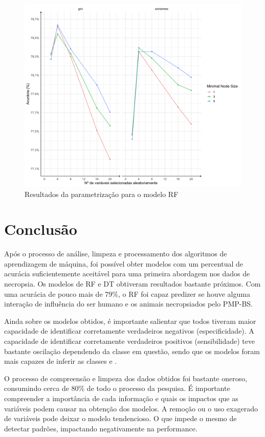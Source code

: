 \documentclass[12pt]{article}
\begin{document}
\begin{figure}[ht]
\centering
\includegraphics[width=.8\textwidth]{rf_resultados.png}
\caption{Resultados da parametrização para o modelo RF}
\label{fig:rf_resultados}
\end{figure}

\section{Conclusão}

Após o processo de análise, limpeza e processamento dos algoritmos de aprendizagem de máquina, foi possível obter modelos com um percentual de acurácia suficientemente aceitável para uma primeira abordagem nos dados de necropsia. Os modelos de RF e DT obtiveram resultados bastante próximos. Com uma acurácia de pouco mais de 79\%, o RF foi capaz predizer se houve alguma interação de influência do ser humano e os animais necropsiados pelo PMP-BS.

Ainda sobre os modelos obtidos, é importante salientar que todos tiveram maior capacidade de identificar corretamente verdadeiros negativos (especificidade). A capacidade de identificar corretamente verdadeiros positivos (sensibilidade) teve bastante oscilação dependendo da classe em questão, sendo que os modelos foram mais capazes de inferir as classes  e .

O processo de compreensão e limpeza dos dados obtidos foi bastante oneroso, consumindo cerca de 80\% de todo o processo da pesquisa. É importante compreender a importância de cada informação e quais os impactos que as variáveis podem causar na obtenção dos modelos. A remoção ou o uso exagerado de variáveis pode deixar o modelo tendencioso. O que impede o mesmo de detectar padrões, impactando negativamente na performance.
\end{document}
